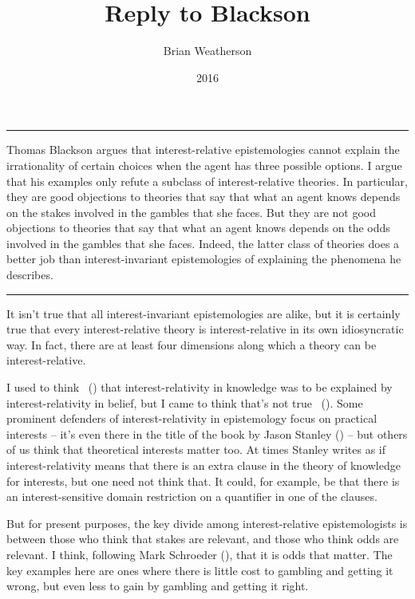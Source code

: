 \documentclass[
  10pt,
  letterpaper,
  DIV=11,
  numbers=noendperiod,
  twoside]{scrartcl}
\title{Reply to Blackson}
\author{Brian Weatherson}
\date{2016}
\renewenvironment{abstract}
 {\vspace{-1.25cm}
 \quotation\small\noindent\rule{\linewidth}{.5pt}\par\smallskip
 \noindent }
 {\par\noindent\rule{\linewidth}{.5pt}\endquotation}
\begin{document}
\maketitle
\begin{abstract}
Thomas Blackson argues that interest-relative epistemologies cannot
explain the irrationality of certain choices when the agent has three
possible options. I argue that his examples only refute a subclass of
interest-relative theories. In particular, they are good objections to
theories that say that what an agent knows depends on the stakes
involved in the gambles that she faces. But they are not good objections
to theories that say that what an agent knows depends on the odds
involved in the gambles that she faces. Indeed, the latter class of
theories does a better job than interest-invariant epistemologies of
explaining the phenomena he describes.
\end{abstract}

It isn't true that all interest-invariant epistemologies are alike, but
it is certainly true that every interest-relative theory is
interest-relative in its own idiosyncratic way. In fact, there are at
least four dimensions along which a theory can be interest-relative.

I used to think ~()
that interest-relativity in knowledge was to be explained by
interest-relativity in belief, but I came to think that's not true
~(). Some prominent
defenders of interest-relativity in epistemology focus on practical
interests -- it's even there in the title of the book by Jason Stanley
() -- but others of us think that
theoretical interests matter too. At times Stanley writes as if
interest-relativity means that there is an extra clause in the theory of
knowledge for interests, but one need not think that. It could, for
example, be that there is an interest-sensitive domain restriction on a
quantifier in one of the clauses.

But for present purposes, the key divide among interest-relative
epistemologists is between those who think that stakes are relevant, and
those who think odds are relevant. I think, following Mark Schroeder
(), that it is odds that matter. The
key examples here are ones where there is little cost to gambling and
getting it wrong, but even less to gain by gambling and getting it
right.
\end{document}
